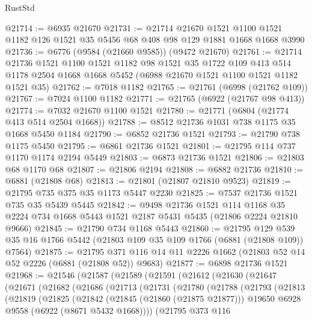\begin{lexlean}{RustStd}
\begin{coremodule}
@21714 := @6935 @21670
@21731 := @21714
    @21670
    @1521
    @1100
    @1521
    @1182
    @126
    @1521
    @35
    @5456
    @68
    @408
    @98
    @129
    @1881
    @1668
    @1668
    @3990
@21736 := @6776 (@9584 (@21660 @9585)) (@9472 @21670)
@21761 := @21714
    @21736
    @1521
    @1100
    @1521
    @1182
    @98
    @1521
    @35
    @1722
    @109
    @413
    @514
    @1178
    @2504
    @1668
    @1668
    @5452
    (@6988 @21670 @1521 @1100 @1521 @1182 @1521 @35)
@21762 := @7018 @1182
@21765 := @21761 (@6998 (@21762 @109))
@21767 := @7024 @1100 @1182
@21771 := @21765 (@6922 (@21767 @98 @413))
@21774 := @7032 @21670 @1100 @1521
@21780 := @21771 (@6804 (@21774 @413 @514 @2504 @1668))
@21788 := @8512 @21736 @1031 @738 @1175 @35 @1668 @5450 @1184
@21790 := @6852 @21736 @1521
@21793 := @21790 @738 @1175 @5450
@21795 := @6861 @21736 @1521
@21801 := @21795 @114 @737 @1170 @1174 @2194 @5449
@21803 := @6873 @21736 @1521
@21806 := @21803 @68 @1170 @68
@21807 := @21806 @2194
@21808 := @6882 @21736
@21810 := @6881 (@21808 @68)
@21813 := @21801 (@21807 @21810 @9523)
@21819 := @21795 @735 @375 @35 @1173 @5447 @2230
@21825 := @7537 @21736 @1521 @735 @35 @5439 @5445
@21842 := @9498
    @21736
    @1521
    @114
    @1168
    @35
    @2224
    @734
    @1668
    @5443
    @1521
    @2187
    @5431
    @5435
    (@21806 @2224 @21810 @9666)
@21845 := @21790 @734 @1168 @5443
@21860 := @21795
    @129
    @539
    @35
    @16
    @1766
    @5442
    (@21803 @109 @35 @109 @1766 (@6881 (@21808 @109)) @7564)
@21875 := @21795 @371 @116 @14 @11 @2226 @1662 (@21803 @52 @14 @52 @2226 (@6881 (@21808 @52)) @9683)
@21877 := @6898 @21736 @1521
@21968 := @21546
    (@21587
      (@21589
        (@21591
          (@21612
            (@21630
              (@21647
                (@21671
                  (@21682
                    (@21686
                      (@21713
                        (@21731
                          (@21780
                            (@21788
                              (@21793
                                (@21813
                                  (@21819
                                    (@21825
                                      (@21842
                                        (@21845 (@21860 (@21875 @21877)))
                                        @19650
                                        @6928
                                        @9558
                                        (@6922 (@8671 @5432 @1668))))
                                    (@21795
                                      @373
                                      @116

\end{coremodule}
\end{lexlean}
